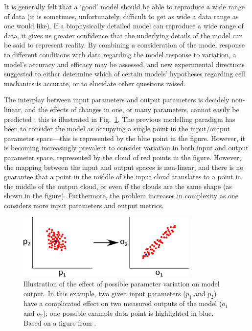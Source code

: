 \documentclass[../thesis-main.tex]{subfiles}
\begin{document}
 It is generally felt that a `good' model should be able to reproduce a wide range of data (it is sometimes, unfortunately, difficult to get as wide a data range as one would like). If a biophysically detailed model can reproduce a wide range of data, it gives us greater confidence that the underlying details of the model can be said to represent reality. By combining a consideration of the model response to different conditions with data regarding the model response to variation, a model's accuracy and efficacy may be assessed, and new experimental directions suggested to either determine which of certain models' hypotheses regarding cell mechanics is accurate, or to elucidate other questions raised.
 
 The interplay between input parameters and output parameters is decidely non-linear, and the effects of changes in one, or many parameters, cannot easily be predicted \citep{Sarkar2012}; this is illustrated in Fig.~\ref{fig:param-var-effect}. The previous modelling paradigm has been to consider the model as occupying a single point in the input/output parameter space---this is represented by the blue point in the figure. However, it is becoming increasingly prevalent to consider variation in both input and output parameter space, represented by the cloud of red points in the figure. However, the mapping between the input and output spaces is non-linear, and there is no guarantee that a point in the middle of the input cloud translates to a point in the middle of the output cloud, or even if the clouds are the same shape (as shown in the figure). Furthermore, the problem increases in complexity as one considers more input parameters and output metrics.
 \begin{figure}
  \centering
  \includegraphics[width=0.8\textwidth]{param-var-effect}
  \caption[Effect of parameter variation on model output.]{Illustration of the effect of possible parameter variation on model output. In this example, two given input parameters ($p_1$ and $p_2$) have a complicated effect on two measured outputs of the model ($o_1$ and $o_2$); one possible example data point is highlighted in blue. Based on a figure from \citet{Sarkar2012}.}
  \label{fig:param-var-effect}
 \end{figure}
 
\end{document}
